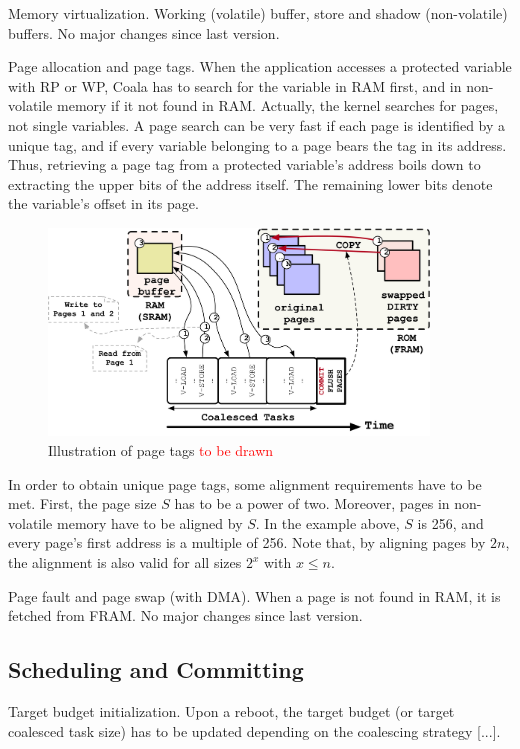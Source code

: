 Memory virtualization. Working (volatile) buffer, store and shadow (non-volatile) buffers. No major changes since last version.

Page allocation and page tags. When the application accesses a protected variable with RP or WP, Coala has to search for the variable in RAM first, and in non-volatile memory if it not found in RAM. Actually, the kernel searches for pages, not single variables. A page search can be very fast if each page is identified by a unique tag, and if every variable belonging to a page bears the tag in its address. Thus, retrieving a page tag from a protected variable’s address boils down to extracting the upper bits of the address itself. The remaining lower bits denote the variable’s offset in its page.

\begin{figure}
	\includegraphics[width=0.9\textwidth]{figures/graffle/paging.pdf}
	\caption{Illustration of page tags \textcolor{red}{to be drawn}}
\end{figure}

In order to obtain unique page tags, some alignment requirements have to be met. First, the page size $S$ has to be a power of two. Moreover, pages in non-volatile memory have to be aligned by $S$. In the example above, $S$ is 256, and every page’s first address is a multiple of 256. Note that, by aligning pages by $2n$, the alignment is also valid for all sizes $2^x$ with $x \leq n$.

Page fault and page swap (with DMA). When a page is not found in RAM, it is fetched from FRAM. No major changes since last version.

\subsection{Scheduling and Committing}

Target budget initialization. Upon a reboot, the target budget (or target coalesced task size) has to be updated depending on the coalescing strategy [...].

